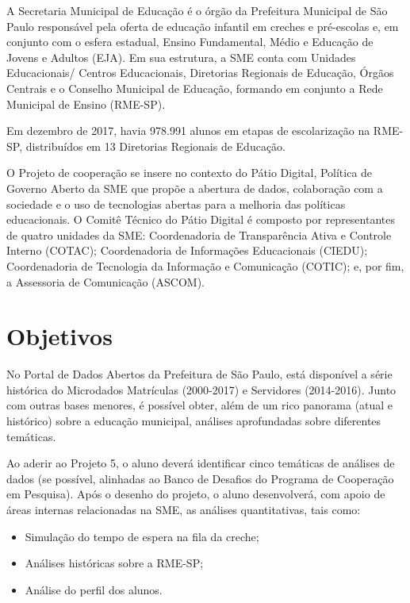 \documentclass{article}
\begin{document}
A Secretaria Municipal de Educação é o órgão da Prefeitura Municipal de São Paulo responsável pela oferta de educação infantil em creches e pré-escolas e, em conjunto com o esfera estadual, Ensino Fundamental, Médio e Educação de Jovens e Adultos (EJA). Em sua estrutura, a SME conta com Unidades Educacionais/ Centros Educacionais, Diretorias Regionais de Educação, Órgãos Centrais e o Conselho Municipal de Educação, formando em conjunto a Rede Municipal de Ensino (RME-SP).

Em dezembro de 2017, havia 978.991 alunos em etapas de escolarização na RME-SP, distribuídos em 13 Diretorias Regionais de Educação. 

O Projeto de cooperação se insere no contexto do Pátio Digital, Política de Governo Aberto da SME que propõe a abertura de dados, colaboração com a sociedade e o uso de tecnologias abertas para a melhoria das políticas educacionais. O Comitê Técnico do Pátio Digital é composto por representantes de quatro unidades da SME: Coordenadoria de Transparência Ativa e Controle Interno (COTAC); Coordenadoria de Informações Educacionais (CIEDU); Coordenadoria de Tecnologia da Informação e Comunicação (COTIC); e, por fim, a Assessoria de Comunicação (ASCOM). 

\section{Objetivos}

No Portal de Dados Abertos da Prefeitura de São Paulo, está disponível a série histórica do Microdados Matrículas (2000-2017) e Servidores (2014-2016). Junto com outras bases menores, é possível obter, além de um rico panorama (atual e histórico) sobre a educação municipal, análises aprofundadas sobre diferentes temáticas. 

Ao aderir ao Projeto 5, o aluno deverá identificar cinco temáticas de análises de dados (se possível, alinhadas ao Banco de Desafios do Programa de Cooperação em Pesquisa). Após o desenho do projeto, o aluno desenvolverá, com apoio de áreas internas relacionadas na SME, as análises quantitativas, tais como: 

\begin{itemize}
\item Simulação do tempo de espera na fila da creche;
\item Análises históricas sobre a RME-SP;
\item Análise do perfil dos alunos.
\end{itemize}
\end{document}
